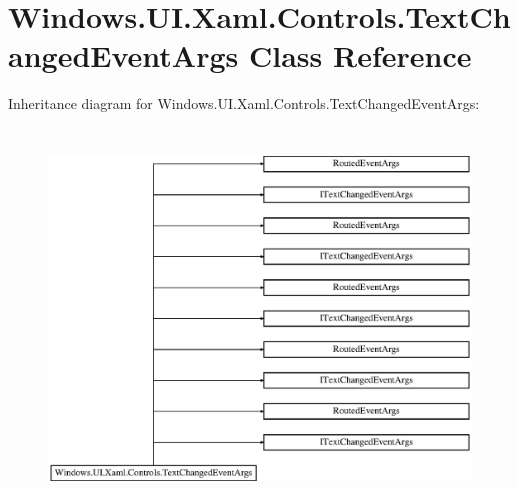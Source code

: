 \hypertarget{class_windows_1_1_u_i_1_1_xaml_1_1_controls_1_1_text_changed_event_args}{}\section{Windows.\+U\+I.\+Xaml.\+Controls.\+Text\+Changed\+Event\+Args Class Reference}
\label{class_windows_1_1_u_i_1_1_xaml_1_1_controls_1_1_text_changed_event_args}
Inheritance diagram for Windows.\+U\+I.\+Xaml.\+Controls.\+Text\+Changed\+Event\+Args\+:\begin{figure}[H]
\begin{center}
\leavevmode
\includegraphics[height=10.098360cm]{class_windows_1_1_u_i_1_1_xaml_1_1_controls_1_1_text_changed_event_args}
\end{center}
\end{figure}
